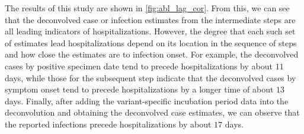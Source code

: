 \documentclass{article}
\begin{document}
The results of this study are shown in \autoref{fig:abl_lag_cor}. From
this, we can see that the deconvolved case or infection estimates from the
intermediate steps are all leading indicators of hospitalizations. However, the
degree that each such set of estimates lead hospitalizations depend on its
location in the sequence of steps and how close the estimates are to infection
onset. For example, the deconvolved cases by positive specimen date tend to
precede hospitalizations by about $11$ days, while those for the subsequent step
indicate that the deconvolved cases by symptom onset tend to precede
hospitalizations by a longer time of about $13$ days. Finally, after adding the
variant-specific incubation period data into the deconvolution and obtaining the
deconvolved case estimates, we can observe that the reported infections precede
hospitalizations by about $17$ days. 
\end{document}
